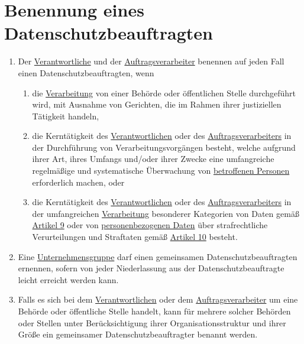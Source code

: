 \chapter{Benennung eines Datenschutzbeauftragten}
\label{ch:37}


\begin{enumerate}

  \item Der \hyperref[itm:04-7]{Verantwortliche} und der \hyperref[itm:04-8]{Auftragsverarbeiter} benennen auf jeden
   Fall einen Datenschutzbeauftragten, wenn
  \label{itm:37-1}

  \begin{enumerate}
  
    \item die \hyperref[itm:04-2]{Verarbeitung} von einer Behörde oder öffentlichen Stelle durchgeführt wird, mit
     Ausnahme von Gerichten, die im Rahmen ihrer justiziellen Tätigkeit handeln,
    \label{itm:37-1a}

    \item die Kerntätigkeit des \hyperref[itm:04-7]{Verantwortlichen} oder des \hyperref[itm:04-8]
     {Auftragsverarbeiters} in der Durchführung von Verarbeitungsvorgängen besteht, welche aufgrund ihrer Art, ihres
     Umfangs und/oder ihrer Zwecke eine umfangreiche regelmäßige und systematische Überwachung von \hyperref[itm:04-1]
     {betroffenen Personen} erforderlich machen, oder
    \label{itm:37-1b}

    \item die Kerntätigkeit des \hyperref[itm:04-7]{Verantwortlichen} oder des \hyperref[itm:04-8]
     {Auftragsverarbeiters} in der umfangreichen \hyperref[itm:04-2]{Verarbeitung} besonderer Kategorien von Daten
     gemäß \hyperref[ch:9]{Artikel 9} oder von \hyperref[itm:04-1]{personenbezogenen Daten} über strafrechtliche
     Verurteilungen und Straftaten gemäß \hyperref[ch:10]{Artikel 10} besteht.
    \label{itm:37-1c}

  \end{enumerate}

  \item Eine \hyperref[itm:04-19]{Unternehmensgruppe} darf einen gemeinsamen Datenschutzbeauftragten ernennen, sofern
   von jeder Niederlassung aus der Datenschutzbeauftragte leicht erreicht werden kann.
  \label{itm:37-2}

  \item Falls es sich bei dem \hyperref[itm:04-7]{Verantwortlichen} oder dem \hyperref[itm:04-8]{Auftragsverarbeiter} um
   eine Behörde oder öffentliche Stelle handelt, kann für mehrere solcher Behörden oder Stellen unter Berücksichtigung
   ihrer Organisationsstruktur und ihrer Größe ein gemeinsamer Datenschutzbeauftragter benannt werden.
  \label{itm:37-3}


\end{enumerate}
